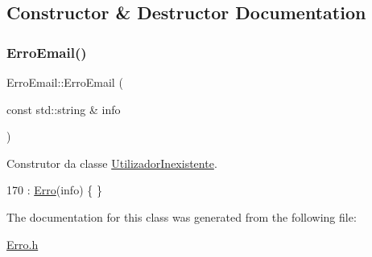 \subsection{Constructor \& Destructor Documentation}
\mbox{\label{classErroEmail_a536520637b17434e8fd8ab296db9e026}} 
\subsubsection{\texorpdfstring{Erro\+Email()}{ErroEmail()}}
{\footnotesize\ttfamily Erro\+Email\+::\+Erro\+Email (\begin{DoxyParamCaption}\item[{const std\+::string \&}]{info }\end{DoxyParamCaption})\hspace{0.3cm}{\ttfamily [inline]}}



Construtor da classe \hyperlink{classUtilizadorInexistente}{Utilizador\+Inexistente}. 


\begin{DoxyCode}
170 : \hyperlink{classErro_a15d79796bd17517ff05d45eee55556f1}{Erro}(info) \{ \}
\end{DoxyCode}


The documentation for this class was generated from the following file\+:\begin{DoxyCompactItemize}
\item 
\hyperlink{Erro_8h}{Erro.\+h}\end{DoxyCompactItemize}
